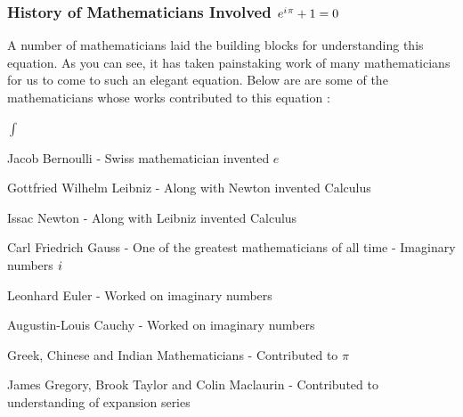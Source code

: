 \documentclass[10pt]{beamer}
\newcommand{\iu}{{i\mkern1mu}}
\begin{document}
\begin{frame}
	\frametitle{ History of Mathematicians Involved \hspace{25pt} \textcolor{pink}{\Huge\(e^{\iu \pi} +1 = 0\)}}

	A number o\label{key}f mathematicians laid the building blocks for understanding this equation.  As you can see, it has taken painstaking work of many mathematicians for us to come to such an elegant equation. Below are are some of the mathematicians whose works contributed to this equation :
	\vspace{10pt}

	\begin{list}{$\int$}{}
		\item Jacob Bernoulli - Swiss mathematician invented $e$
		\item  Gottfried Wilhelm Leibniz  - Along with Newton invented Calculus
		\item Issac Newton - Along with Leibniz invented Calculus
		\item Carl Friedrich Gauss - One of the greatest mathematicians of all time - Imaginary numbers $\iu$
		\item Leonhard Euler - Worked on imaginary numbers
		\item Augustin-Louis Cauchy - Worked on imaginary numbers
		\item Greek, Chinese and Indian Mathematicians - Contributed to $\pi$
		\item James Gregory, Brook Taylor and Colin Maclaurin - Contributed to understanding of expansion series
	\end{list}

\end{frame}
\end{document}
